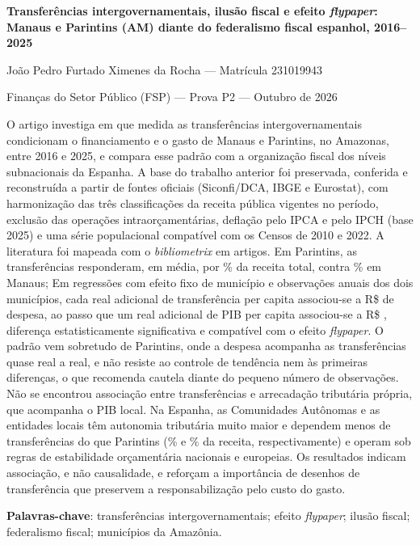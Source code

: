 \documentclass[article,11pt,oneside,a4paper,english,brazil,sumario=tradicional]{abntex2}
\begin{document}
\frenchspacing

\begin{center}
{\large\bfseries Transferências intergovernamentais, ilusão fiscal e efeito \textit{flypaper}: Manaus e Parintins (AM) diante do federalismo fiscal espanhol, 2016--2025\par}
\vspace{0.4cm}
{\normalsize João Pedro Furtado Ximenes da Rocha --- Matrícula 231019943\par}
{\small Finanças do Setor Público (FSP) --- Prova P2 --- Outubro de 2026\par}
\end{center}
\vspace{0.3cm}

\begin{resumoumacoluna}
O artigo investiga em que medida as transferências intergovernamentais condicionam o financiamento e o gasto de Manaus e Parintins, no Amazonas, entre 2016 e 2025, e compara esse padrão com a organização fiscal dos níveis subnacionais da Espanha. A base do trabalho anterior foi preservada, conferida e reconstruída a partir de fontes oficiais (Siconfi/DCA, IBGE e Eurostat), com harmonização das três classificações da receita pública vigentes no período, exclusão das operações intraorçamentárias, deflação pelo IPCA e pelo IPCH (base 2025) e uma série populacional compatível com os Censos de 2010 e 2022. A literatura foi mapeada com o \textit{bibliometrix} em \bibDocs{} artigos. Em Parintins, as transferências responderam, em média, por \depParMedia\% da receita total, contra \depManMedia\% em Manaus; Em regressões com efeito fixo de município e \nUm{} observações anuais dos dois municípios, cada real adicional de transferência per capita associou-se a R\$ \bTrUm{} de despesa, ao passo que um real adicional de PIB per capita associou-se a R\$ \bPibUm{}, diferença estatisticamente significativa e compatível com o efeito \textit{flypaper}. O padrão vem sobretudo de Parintins, onde a despesa acompanha as transferências quase real a real, e não resiste ao controle de tendência nem às primeiras diferenças, o que recomenda cautela diante do pequeno número de observações. Não se encontrou associação entre transferências e arrecadação tributária própria, que acompanha o PIB local. Na Espanha, as Comunidades Autônomas e as entidades locais têm autonomia tributária muito maior e dependem menos de transferências do que Parintins (\esDepCA\% e \esDepLoc\% da receita, respectivamente) e operam sob regras de estabilidade orçamentária nacionais e europeias. Os resultados indicam associação, e não causalidade, e reforçam a importância de desenhos de transferência que preservem a responsabilização pelo custo do gasto.

\vspace{\onelineskip}
\noindent\textbf{Palavras-chave}: transferências intergovernamentais; efeito \textit{flypaper}; ilusão fiscal; federalismo fiscal; municípios da Amazônia.
\end{resumoumacoluna}
\end{document}
